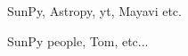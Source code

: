 
\begin{acknowledgements}      


SunPy, Astropy, yt, Mayavi etc.

SunPy people, Tom, etc...


\end{acknowledgements}
